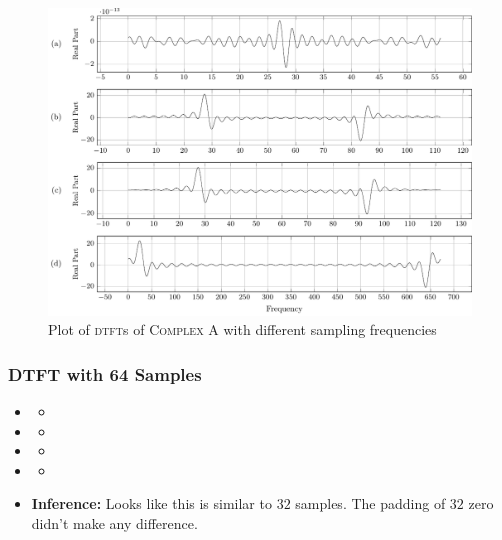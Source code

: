 \documentclass[../../course]{subfiles}
\begin{document}
\begin{figure} [H]
    \centering
     {
        \includegraphics[height = 0.8\textheight] {tikzpics/plotDtftComplexA32.pdf}
    }
     {Plot of \textsc{dtft}s of \textsc{Complex A} with different sampling frequencies}
    \label{plt:dtftCplxA32}
\end{figure}

\subsubsection{DTFT with 64 Samples}

\begin{itemize} [label=]

    \item \sampFreqMuchLess
        \begin{itemize} [label=]
            \item
        \end{itemize}

    \item \sampFreqNorm
        \begin{itemize} [label=]
            \item
        \end{itemize}

    \item \sampFreqSligGreat
        \begin{itemize} [label=]
            \item
        \end{itemize}

    \item \sampFreqMuchGreat
        \begin{itemize} [label=]
            \item
        \end{itemize}

    \item \textbf{Inference:} Looks like this is similar to $32$ samples. The padding of $32$
        zero didn't make any difference.

\end{itemize}
\end{document}
